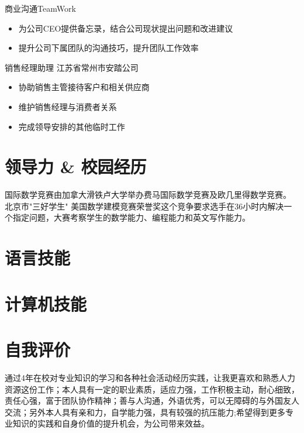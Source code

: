 \documentclass[11pt,a4paper]{moderncv}
\begin{document}
{商业沟通TeamWork}
{}
{}{}
{\begin{itemize}
\item 为公司CEO提供备忘录，结合公司现状提出问题和改进建议
\item 提升公司下属团队的沟通技巧，提升团队工作效率
\end{itemize}
}

{销售经理助理}
{江苏省常州市安踏公司}
{}{}
{
\begin{itemize}
\item 协助销售主管接待客户和相关供应商 
\item 维护销售经理与消费者关系
\item 完成领导安排的其他临时工作
\end{itemize}
}

\section{领导力 \& 校园经历} %
{国际数学竞赛}{由加拿大滑铁卢大学举办费马国际数学竞赛及欧几里得数学竞赛。}{}{}{}
{北京市"三好学生"}{}{}{}{}
{美国数学建模竞赛荣誉奖}{}{}{}{这个竞争要求选手在36小时内解决一个指定问题，大赛考察学生的数学能力、编程能力和英文写作能力。}

\section{语言技能}

\section{计算机技能}

\section{自我评价}
\cvline{ }
{\setlength\parindent{2em}通过4年在校对专业知识的学习和各种社会活动经历实践，让我更喜欢和熟悉人力资源这份工作；本人具有一定的职业素质，适应力强，工作积极主动，耐心细致，责任心强，富于团队协作精神；善与人沟通，外语优秀，可以无障碍的与外国友人交流；另外本人具有亲和力，自学能力强，具有较强的抗压能力;希望得到更多专业知识的实践和自身价值的提升机会，为公司带来效益。}


\closesection{}                   %
\renewcommand{\listitemsymbol}{-} %
\end{document}
